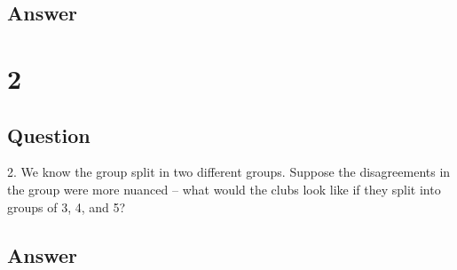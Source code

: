 \documentclass[letterpaper,11pt]{article}
\begin{document}
\newpage
\subsection*{Answer}

\newpage

\section*{2}

\subsection*{Question}

2.  We know the group split in two different groups.  Suppose the
disagreements in the group were more nuanced -- what would the clubs
look like if they split into groups of 3, 4, and 5?


\subsection*{Answer}


\clearpage


\end{document}
